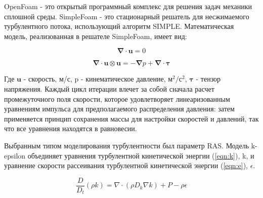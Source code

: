 \documentclass[14pt,a4paper]{article}
\begin{document}
        OpenFoam - это открытый программный комплекс для решения задач механики сплошной среды. SimpleFoam - это стационарный решатель для несжимаемого турбулентного потока, использующий алгоритм SIMPLE. Математическая модель, реализованная в решателе SimpleFoam, имеет вид:
        
        \begin{equation}\label{eqn:simpleFoam}
            \bm{\nabla} \cdot \bm{u} = 0
        \end{equation} 
        
        \begin{equation}\label{eqn:simpleFoam2}
            \bm{\nabla} \cdot \bm{u} \otimes \bm{u} = -\bm{\nabla} p + \bm{\nabla} \cdot \bm{\tau}
        \end{equation} 
        
        Где $\bm{u}$ - скорость, м/с, p - кинематическое давление, м$^{2}/$с$^{2}$, $\bm{\tau}$ - тензор напряжения. 
        Каждый цикл итерации влечет за собой сначала расчет промежуточного поля скорости, которое удовлетворяет линеаризованным уравнениям импульса для предполагаемого распределения давления: затем применяется принцип сохранения массы для настройки скоростей и давлений, так что все уравнения находятся в равновесии.
        
%        
%        
%        
        
        Выбранным типом моделирования турбулентности был параметр RAS. Модель k-epsilon объединяет уравнения турбулентной кинетической энергии (\ref{eqn:k}), k, и уравнение скорости рассеивания турбулентной кинетической энергии (\ref{eqn:e}), $\epsilon$.
        
        \begin{equation}\label{eqn:k}
            \frac{D}{D_{t}}(\rho k) = \nabla \cdot (\rho D_{k}\nabla k) + P - \rho\epsilon
        \end{equation} 
        
\end{document}
